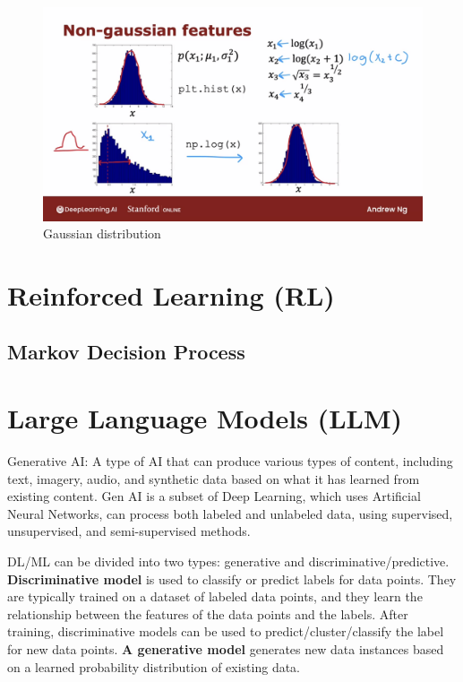 \documentclass[12pt]{report}
\begin{document}
\begin{figure}[H]
  \centering
  \includegraphics[trim =0.0cm 0.0cm 0.0cm 0.0cm, clip, scale=0.15]{pics/convertToGaussian.png}
  \caption{Gaussian distribution}
\end{figure}




\chapter[Reinforced Learning]{Reinforced Learning (RL)}

\section{Markov Decision Process}

\chapter[Large Language Models]{Large Language Models (LLM)}

Generative AI: A type of AI that can produce various types of content, including text, imagery, audio, and synthetic data based on what it has learned from existing content. Gen AI is a subset of Deep Learning, which uses Artificial Neural Networks, can process both labeled and unlabeled data, using supervised, unsupervised, and semi-supervised methods.


DL/ML can be divided into two types: generative and discriminative/predictive. \textbf{Discriminative model} is used to classify or predict labels for data points. They are typically trained on a dataset of labeled data points, and they learn the relationship between the features of the data points and the labels. After training, discriminative models can be used to predict/cluster/classify  the label for new data points. \textbf{A generative model }generates new data instances based on a learned probability distribution of existing data.
\end{document}
